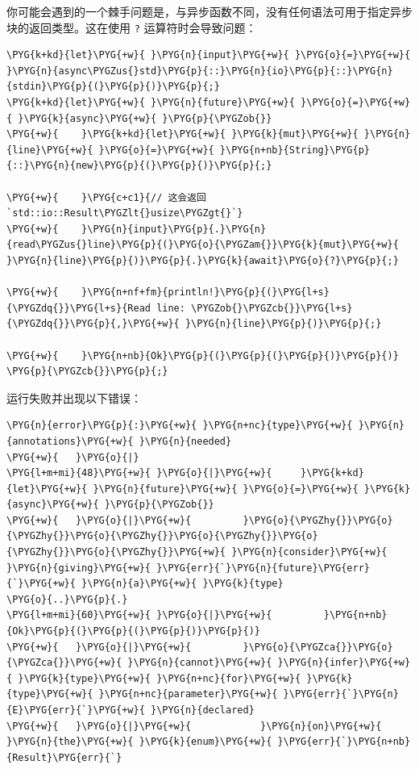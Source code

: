 你可能会遇到的一个棘手问题是，与异步函数不同，没有任何语法可用于指定异步块的返回类型。这在使用 \texttt{?} 运算符时会导致问题：

\begin{Verbatim}[commandchars=\\\{\},breaklines=true,breakanywhere=true,fontsize=\codefont,xleftmargin=17bp]
\PYG{k+kd}{let}\PYG{+w}{ }\PYG{n}{input}\PYG{+w}{ }\PYG{o}{=}\PYG{+w}{ }\PYG{n}{async\PYGZus{}std}\PYG{p}{::}\PYG{n}{io}\PYG{p}{::}\PYG{n}{stdin}\PYG{p}{(}\PYG{p}{)}\PYG{p}{;}
\PYG{k+kd}{let}\PYG{+w}{ }\PYG{n}{future}\PYG{+w}{ }\PYG{o}{=}\PYG{+w}{ }\PYG{k}{async}\PYG{+w}{ }\PYG{p}{\PYGZob{}}
\PYG{+w}{    }\PYG{k+kd}{let}\PYG{+w}{ }\PYG{k}{mut}\PYG{+w}{ }\PYG{n}{line}\PYG{+w}{ }\PYG{o}{=}\PYG{+w}{ }\PYG{n+nb}{String}\PYG{p}{::}\PYG{n}{new}\PYG{p}{(}\PYG{p}{)}\PYG{p}{;}

\PYG{+w}{    }\PYG{c+c1}{// 这会返回`std::io::Result\PYGZlt{}usize\PYGZgt{}`}
\PYG{+w}{    }\PYG{n}{input}\PYG{p}{.}\PYG{n}{read\PYGZus{}line}\PYG{p}{(}\PYG{o}{\PYGZam{}}\PYG{k}{mut}\PYG{+w}{ }\PYG{n}{line}\PYG{p}{)}\PYG{p}{.}\PYG{k}{await}\PYG{o}{?}\PYG{p}{;}

\PYG{+w}{    }\PYG{n+nf+fm}{println!}\PYG{p}{(}\PYG{l+s}{\PYGZdq{}}\PYG{l+s}{Read line: \PYGZob{}\PYGZcb{}}\PYG{l+s}{\PYGZdq{}}\PYG{p}{,}\PYG{+w}{ }\PYG{n}{line}\PYG{p}{)}\PYG{p}{;}

\PYG{+w}{    }\PYG{n+nb}{Ok}\PYG{p}{(}\PYG{p}{(}\PYG{p}{)}\PYG{p}{)}
\PYG{p}{\PYGZcb{}}\PYG{p}{;}
\end{Verbatim}

运行失败并出现以下错误：

\begin{Verbatim}[commandchars=\\\{\},breaklines=true,breakanywhere=true,fontsize=\codefont,xleftmargin=17bp]
\PYG{n}{error}\PYG{p}{:}\PYG{+w}{ }\PYG{n+nc}{type}\PYG{+w}{ }\PYG{n}{annotations}\PYG{+w}{ }\PYG{n}{needed}
\PYG{+w}{   }\PYG{o}{|}
\PYG{l+m+mi}{48}\PYG{+w}{ }\PYG{o}{|}\PYG{+w}{     }\PYG{k+kd}{let}\PYG{+w}{ }\PYG{n}{future}\PYG{+w}{ }\PYG{o}{=}\PYG{+w}{ }\PYG{k}{async}\PYG{+w}{ }\PYG{p}{\PYGZob{}}
\PYG{+w}{   }\PYG{o}{|}\PYG{+w}{         }\PYG{o}{\PYGZhy{}}\PYG{o}{\PYGZhy{}}\PYG{o}{\PYGZhy{}}\PYG{o}{\PYGZhy{}}\PYG{o}{\PYGZhy{}}\PYG{o}{\PYGZhy{}}\PYG{+w}{ }\PYG{n}{consider}\PYG{+w}{ }\PYG{n}{giving}\PYG{+w}{ }\PYG{err}{`}\PYG{n}{future}\PYG{err}{`}\PYG{+w}{ }\PYG{n}{a}\PYG{+w}{ }\PYG{k}{type}
\PYG{o}{..}\PYG{p}{.}
\PYG{l+m+mi}{60}\PYG{+w}{ }\PYG{o}{|}\PYG{+w}{         }\PYG{n+nb}{Ok}\PYG{p}{(}\PYG{p}{(}\PYG{p}{)}\PYG{p}{)}
\PYG{+w}{   }\PYG{o}{|}\PYG{+w}{         }\PYG{o}{\PYGZca{}}\PYG{o}{\PYGZca{}}\PYG{+w}{ }\PYG{n}{cannot}\PYG{+w}{ }\PYG{n}{infer}\PYG{+w}{ }\PYG{k}{type}\PYG{+w}{ }\PYG{n+nc}{for}\PYG{+w}{ }\PYG{k}{type}\PYG{+w}{ }\PYG{n+nc}{parameter}\PYG{+w}{ }\PYG{err}{`}\PYG{n}{E}\PYG{err}{`}\PYG{+w}{ }\PYG{n}{declared}
\PYG{+w}{   }\PYG{o}{|}\PYG{+w}{            }\PYG{n}{on}\PYG{+w}{ }\PYG{n}{the}\PYG{+w}{ }\PYG{k}{enum}\PYG{+w}{ }\PYG{err}{`}\PYG{n+nb}{Result}\PYG{err}{`}
\end{Verbatim}

